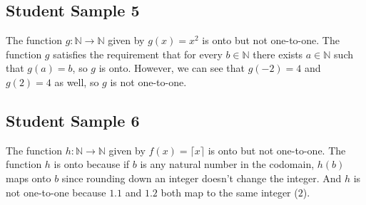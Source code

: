 \documentclass[11pt,letterpaper]{article}
\begin{document}


\subsection*{Student Sample 5} %
\label{sub:student_sample_5}

The function $g:\mathbb{N} \rightarrow \mathbb{N}$ given by $g(x) = x^2$ is onto but not one-to-one. The function $g$ satisfies the requirement that for every $b \in \mathbb{N}$ there exists $a \in \mathbb{N}$ such that $g(a) = b$, so $g$ is onto. However, we can see that $g(-2) = 4$ and $g(2) = 4$ as well, so $g$ is not one-to-one. 



\subsection*{Student Sample 6} %
\label{sub:student_sample_6}

The function $h:\mathbb{N} \rightarrow \mathbb{N}$ given by $f(x) = \lceil x \rceil$ is onto but not one-to-one. The function $h$ is onto because if $b$ is any natural number in the codomain, $h(b)$ maps onto $b$ since rounding down an integer doesn't change the integer. And $h$ is not one-to-one because $1.1$ and $1.2$ both map to the same integer ($2$). 


\end{document}
